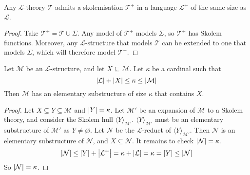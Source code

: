 \begin{corollary}
    Any \( \mathcal L \)-theory \( \mathcal T \) admits a skolemisation \( \mathcal T^+ \) in a language \( \mathcal L^+ \) of the same size as \( \mathcal L \).
\end{corollary}
\begin{proof}
    Take \( \mathcal T^+ = \mathcal T \cup \Sigma \).
    Any model of \( \mathcal T^+ \) models \( \Sigma \), so \( \mathcal T^+ \) has Skolem functions.
    Moreover, any \( \mathcal L \)-structure that models \( \mathcal T \) can be extended to one that models \( \Sigma \), which will therefore model \( \mathcal T^+ \).
\end{proof}
\begin{corollary}
    Let \( \mathcal M \) be an \( \mathcal L \)-structure, and let \( X \subseteq \mathcal M \).
    Let \( \kappa \) be a cardinal such that
    \[ \abs{\mathcal L} + \abs{X} \leq \kappa \leq \abs{\mathcal M} \]
    Then \( \mathcal M \) has an elementary substructure of size \( \kappa \) that contains \( X \).
\end{corollary}
\begin{proof}
    Let \( X \subseteq Y \subseteq \mathcal M \) and \( \abs{Y} = \kappa \).
    Let \( \mathcal M' \) be an expansion of \( \mathcal M \) to a Skolem theory, and consider the Skolem hull \( \langle Y \rangle_{\mathcal M'} \).
    \( \langle Y \rangle_{\mathcal M'} \) must be an elementary substructure of \( \mathcal M' \) as \( Y \neq \varnothing \).
    Let \( \mathcal N \) be the \( \mathcal L \)-reduct of \( \langle Y \rangle_{\mathcal M'} \).
    Then \( \mathcal N \) is an elementary substructure of \( \mathcal N \), and \( X \subseteq \mathcal N \).
    It remains to check \( \abs{\mathcal N} = \kappa \).
    \[ \abs{\mathcal N} \leq \abs{Y} + \abs{\mathcal L^+} = \kappa + \abs{\mathcal L} = \kappa = \abs{Y} \leq \abs{\mathcal N} \]
    So \( \abs{\mathcal N} = \kappa \).
\end{proof}

